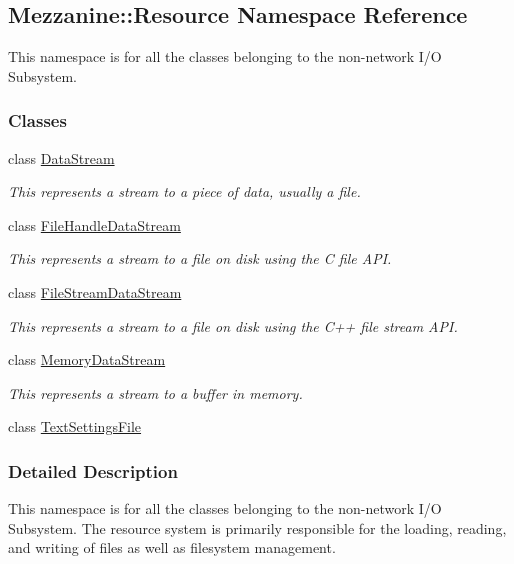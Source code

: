 \hypertarget{namespaceMezzanine_1_1Resource}{
\subsection{Mezzanine::Resource Namespace Reference}
\label{namespaceMezzanine_1_1Resource}
}


This namespace is for all the classes belonging to the non-\/network I/O Subsystem.  


\subsubsection*{Classes}
\begin{DoxyCompactItemize}
\item 
class \hyperlink{classMezzanine_1_1Resource_1_1DataStream}{DataStream}
\begin{DoxyCompactList}\small\item\em This represents a stream to a piece of data, usually a file. \item\end{DoxyCompactList}\item 
class \hyperlink{classMezzanine_1_1Resource_1_1FileHandleDataStream}{FileHandleDataStream}
\begin{DoxyCompactList}\small\item\em This represents a stream to a file on disk using the C file API. \item\end{DoxyCompactList}\item 
class \hyperlink{classMezzanine_1_1Resource_1_1FileStreamDataStream}{FileStreamDataStream}
\begin{DoxyCompactList}\small\item\em This represents a stream to a file on disk using the C++ file stream API. \item\end{DoxyCompactList}\item 
class \hyperlink{classMezzanine_1_1Resource_1_1MemoryDataStream}{MemoryDataStream}
\begin{DoxyCompactList}\small\item\em This represents a stream to a buffer in memory. \item\end{DoxyCompactList}\item 
class \hyperlink{classMezzanine_1_1Resource_1_1TextSettingsFile}{TextSettingsFile}
\end{DoxyCompactItemize}


\subsubsection{Detailed Description}
This namespace is for all the classes belonging to the non-\/network I/O Subsystem. The resource system is primarily responsible for the loading, reading, and writing of files as well as filesystem management. 